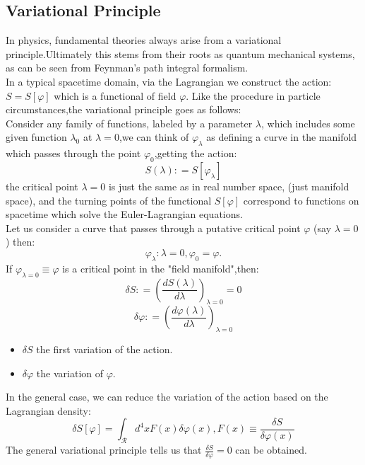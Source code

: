 \documentclass{article}
\begin{document}
\subsection{Variational Principle}
In physics, fundamental theories always arise from a variational principle.Ultimately this stems from their roots as quantum mechanical systems, 
as can be seen from Feynman’s path integral formalism.\\
In a typical spacetime domain, via the Lagrangian we construct the action:$S = S [ \varphi ]$ which is a functional of field $\varphi$.
Like the procedure in particle circumstances,the variational principle goes as follows:\\
Consider any family of functions, labeled by a parameter $\lambda$, which includes some given function $\lambda_0$ at
$\lambda = 0$,we can think of $\varphi_\lambda$ as defining a curve in the manifold which
passes through the point $\varphi_0$,getting the action:
\begin{equation}
    S ( \lambda ) : = S \left[ \varphi _ { \lambda } \right]
\end{equation}
the critical point $\lambda = 0$ is just the same as in real number space, (just manifold space),
and the turning points of the functional $S [ \varphi ]$ correspond
to functions on spacetime which solve the Euler-Lagrangian equations.\\
Let us consider a curve that passes through a putative critical point $\varphi$ (say $\lambda = 0$) then:
\begin{equation}
    \varphi _ { \lambda } :  \lambda = 0,\varphi_0=\varphi.
\end{equation}
If $\varphi _ { \lambda = 0 } \equiv \varphi$ is a critical point in the "field manifold",then:
\begin{equation}
    \delta S : = \left( \frac { d S ( \lambda ) } { d \lambda } \right) _ { \lambda = 0 } = 0
\end{equation}
\begin{equation}
    \delta \varphi : = \left( \frac { d \varphi ( \lambda ) } { d \lambda } \right) _ { \lambda = 0 }
\end{equation}
\begin{itemize}
    \item $\delta S$ the first variation of the action.
    \item $\delta \varphi$ the variation of $\varphi$.
\end{itemize}
In the general case, we can reduce the variation of the action based on the Lagrangian density:
\begin{equation}
    \delta S [ \varphi ] = \int _ { \mathcal { R } } d ^ { 4 } x F ( x ) \delta \varphi ( x ), F ( x ) \equiv \frac { \delta S } { \delta \varphi ( x ) }
\end{equation}
The general variational principle tells us that $\frac { \delta S } { \delta \varphi } = 0$ can be obtained.
\end{document}
